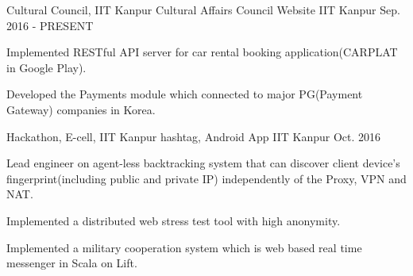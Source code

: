 

\begin{cventries}

  \cventry
    {Cultural Council, IIT Kanpur} %
    {Cultural Affairs Council Website} %
    {IIT Kanpur} %
    {Sep. 2016 - PRESENT} %
    {
      \begin{cvitems} %
        \item {Implemented RESTful API server for car rental booking application(CARPLAT in Google Play).}
        \item {Developed the Payments module which connected to major PG(Payment Gateway) companies in Korea.}
      \end{cvitems}
    }

  \cventry
    {Hackathon, E-cell, IIT Kanpur} %
    {hashtag, Android App} %
    {IIT Kanpur} %
    {Oct. 2016} %
    {
      \begin{cvitems} %
        \item {Lead engineer on agent-less backtracking system that can discover client device's fingerprint(including public and private IP) independently of the Proxy, VPN and NAT.}
        \item {Implemented a distributed web stress test tool with high anonymity.}
        \item {Implemented a military cooperation system which is web based real time messenger in Scala on Lift.}
      \end{cvitems}
    }

\end{cventries}
